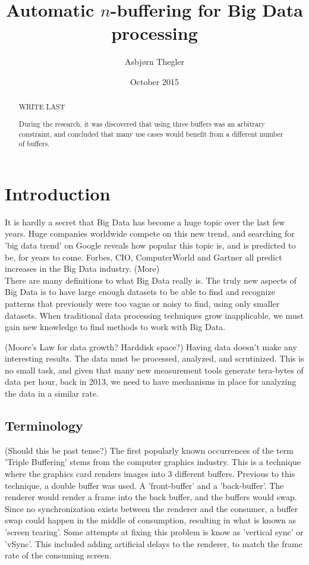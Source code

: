 \documentclass[a4paper]{article}
\title{Automatic $n$-buffering for Big Data processing}
\author{Asbj\o rn Thegler}
\date{October 2015}
\begin{document}
\maketitle

\sloppy

\begin{abstract}
WRITE LAST

During the research, it was discovered that using three buffers was an arbitrary constraint, and
concluded that many use cases would benefit from a different number of buffers.
\end{abstract}

\newpage
\tableofcontents



\newpage
\section{Introduction}
It is hardly a secret that Big Data has become a huge topic over the last few years. Huge companies worldwide
compete on this new trend, and searching for 'big data trend' on Google reveals how popular this topic is, and is predicted to
be, for years to come. Forbes, CIO, ComputerWorld and Gartner all predict increases in the Big Data industry. (More)\\

There are many definitions to what Big Data really is. The truly new aspects of Big Data is to have large enough datasets to be able to find
and recognize patterns that previously were too vague or noisy to find, using only smaller datasets. When traditional data
processing techniques grow inapplicable, we must gain new knowledge to find methods to work with Big Data.

(Moore's Law for data growth? Harddisk space?)
Having data doesn't make any interesting results. The data must be processed, analyzed, and scrutinized. This is no small
task, and given that many new measurement tools generate tera-bytes of data per hour, back in 2013, we need to have mechanisms
in place for analyzing the data in a similar rate.\\


\subsection{Terminology}
(Should this be past tense?)
The first popularly known occurrences of the term 'Triple Buffering' stems from the computer graphics industry.
This is a technique where the graphics card renders images into 3 different buffers. Previous to this technique, a double buffer
was used. A 'front-buffer' and a 'back-buffer'. The renderer would render a frame into the back buffer, and the buffers would swap. Since no
synchronization exists between the renderer and the consumer, a buffer swap could happen in the middle of consumption,
resulting in what is known as 'screen tearing'. Some attempts at fixing this problem is know as 'vertical sync' or 'vSync'.
This included adding artificial delays to the renderer, to match the frame rate of the consuming screen.
\end{document}
